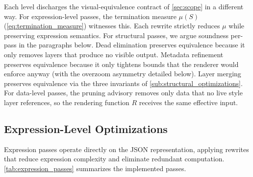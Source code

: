 Each level discharges the visual-equivalence contract of \cref{sec:scope} in a different way.
For expression-level passes, the termination measure $\mu(S)$ (\cref{eq:termination_measure}) witnesses this.
Each rewrite strictly reduces $\mu$ while preserving expression semantics.
For structural passes, we argue soundness per-pass in the paragraphs below.
Dead elimination preserves equivalence because it only removes layers that produce no visible output.
Metadata refinement preserves equivalence because it only tightens bounds that the renderer would enforce anyway (with the overzoom asymmetry detailed below).
Layer merging preserves equivalence via the three invariants of \cref{sub:structural_optimizations}.
For data-level passes, the pruning advisory removes only data that no live style layer references, so the rendering function $R$ receives the same effective input.

\subsection{Expression-Level Optimizations}\label{sub:expression_optimizations}

Expression passes operate directly on the \ac{JSON} representation, applying rewrites that reduce expression complexity and eliminate redundant computation.
\cref{tab:expression_passes} summarizes the implemented passes.

